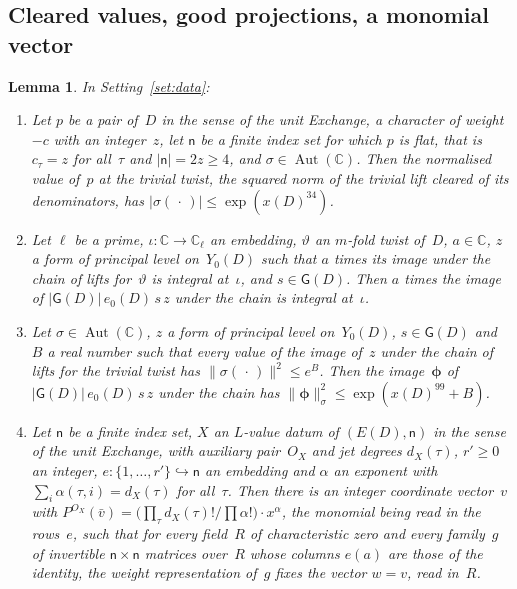 \documentclass[11pt,a4paper]{article}
\newcommand{\m}[1]{\mbox{$#1$}}        %
\theoremstyle{plainx}
\newtheorem{lemma}[theorem]{Lemma}
\theoremstyle{uprightx}
\newcommand{\CC}{\mathbb{C}}
\newcommand{\ix}[1]{\mathsf{#1}}
\newcommand{\AutC}{\operatorname{Aut}(\CC)}
\newcommand{\nsq}[2]{\|#1\|^{2}_{#2}}
\begin{document}
\subsection*{Cleared values, good projections, a monomial vector}
\begin{lemma}\label{l:cleared}
In Setting~\ref{set:data}:
\begin{enumerate}[label=\textup{(\alph*)},leftmargin=2.3em,itemsep=2pt]
\item Let $p$ be a pair of~$D$ in the sense of the unit \emph{Exchange}, a character of weight~$-c$ with an
integer~$z$, let \m{\ix n} be a finite index set for which $p$ is flat, that is \m{c_\tau=z} for all~$\tau$ and
\m{|\ix n|=2z\ge4}, and \m{\sigma\in\AutC}. Then the normalised value of~$p$ at the trivial twist, the squared norm of
the trivial lift cleared of its denominators, has \m{|\sigma(\,\cdot\,)|\le\exp(x(D)^{34})}.
\item Let $\ell$ be a prime, \m{\iota\colon\CC\to\CC_\ell} an embedding, $\vartheta$ an $m$-fold twist of~$D$,
\m{a\in\CC}, $z$ a form of
principal level on~$Y_0(D)$ such that $a$ times its image under the chain of lifts for~$\vartheta$ is integral
at~$\iota$, and \m{s\in\mathsf{G}(D)}. Then $a$ times the image of \m{|\mathsf{G}(D)|\,e_0(D)\,s\,z} under the chain is
integral at~$\iota$.
\item Let \m{\sigma\in\AutC}, $z$ a form of principal level on~$Y_0(D)$, \m{s\in\mathsf{G}(D)} and $B$ a real number
such that every value of the image of~$z$ under the chain of lifts for the trivial twist has
\m{\|\sigma(\,\cdot\,)\|^2\le e^{B}}. Then the image~$\boldsymbol{\phi}$ of \m{|\mathsf{G}(D)|\,e_0(D)\,s\,z} under the chain has
\m{\nsq{\boldsymbol{\phi}}{\sigma}\le\exp(x(D)^{99}+B)}.
\item Let \m{\ix n} be a finite index set, $X$ an $L$-value datum of \m{(E(D),\ix n)} in the sense of the unit
\emph{Exchange}, with auxiliary pair~$O_X$ and jet degrees \m{d_X(\tau)}, \m{r'\ge0} an integer,
\m{e\colon\{1,\dots,r'\}\hookrightarrow\ix n} an embedding and $\alpha$ an exponent with
\m{\sum_i\alpha(\tau,i)=d_X(\tau)} for all~$\tau$. Then there is an integer coordinate vector~$v$ with
\m{P^{O_X}(\bar v)=\bigl(\prod_\tau d_X(\tau)!/\prod\alpha!\bigr)\cdot x^{\alpha}}, the monomial being read in the rows~$e$,
such that for every field~$R$ of characteristic zero and every family~$g$ of invertible \m{\ix n\times\ix n}
matrices over~$R$ whose columns \m{e(a)} are those of the identity, the weight representation of~$g$ fixes the
vector \m{w=v}, read in~$R$.
\end{enumerate}
\end{lemma}
\end{document}
